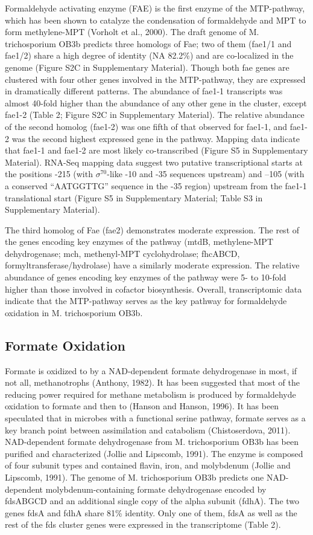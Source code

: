 Formaldehyde activating enzyme (FAE) is the first enzyme of the MTP-pathway, which has been shown to catalyze the condensation of formaldehyde and MPT to form methylene-MPT (Vorholt et al., 2000).
The draft genome of M. trichosporium OB3b predicts three homologs of Fae; two of them (fae1/1 and fae1/2) share a high degree of identity (NA 82.2\%) and are co-localized in the genome (Figure S2C in Supplementary Material).
Though both fae genes are clustered with four other genes involved in the MTP-pathway, they are expressed in dramatically different patterns.
The abundance of fae1-1 transcripts was almost 40-fold higher than the abundance of any other gene in the cluster, except fae1-2 (Table 2; Figure S2C in Supplementary Material).
The relative abundance of the second homolog (fae1-2) was one fifth of that observed for fae1-1, and fae1-2 was the second highest expressed gene in the pathway.
Mapping data indicate that fae1-1 and fae1-2 are most likely co-transcribed (Figure S5 in Supplementary Material).
RNA-Seq mapping data suggest two putative transcriptional starts at the positions -215 (with $\sigma^{70}$-like -10 and -35 sequences upstream) and –105 (with a conserved “AATGGTTG” sequence in the -35 region) upstream from the fae1-1 translational start (Figure S5 in Supplementary Material; Table S3 in Supplementary Material).

The third homolog of Fae (fae2) demonstrates moderate expression.
The rest of the genes encoding key enzymes of the pathway (mtdB, methylene-MPT dehydrogenase; mch, methenyl-MPT cyclohydrolase; fhcABCD, formyltransferase/hydrolase) have a similarly moderate expression.
The relative abundance of genes encoding key enzymes of the pathway were 5- to 10-fold higher than those involved in cofactor biosynthesis.
Overall, transcriptomic data indicate that the MTP-pathway serves as the key pathway for formaldehyde oxidation in M. trichosporium OB3b.

\subsection{Formate Oxidation}
Formate is oxidized to  by a NAD-dependent formate dehydrogenase in most, if not all, methanotrophs (Anthony, 1982).
It has been suggested that most of the reducing power required for methane metabolism is produced by formaldehyde oxidation to formate and then to  (Hanson and Hanson, 1996).
It has been speculated that in microbes with a functional serine pathway, formate serves as a key branch point between assimilation and catabolism (Chistoserdova, 2011).
NAD-dependent formate dehydrogenase from M. trichosporium OB3b has been purified and characterized (Jollie and Lipscomb, 1991).
The enzyme is composed of four subunit types and contained flavin, iron, and molybdenum (Jollie and Lipscomb, 1991).
The genome of M. trichosporium OB3b predicts one NAD-dependent molybdenum-containing formate dehydrogenase encoded by fdsABGCD and an additional single copy of the alpha subunit (fdhA).
The two genes fdsA and fdhA share 81\% identity.
Only one of them, fdsA as well as the rest of the fds cluster genes were expressed in the transcriptome (Table 2).

